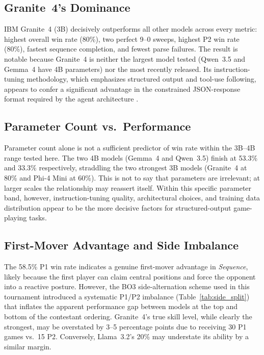 \documentclass[11pt]{article}
\begin{document}
\subsection{Granite~4's Dominance}

IBM Granite~4 (3B) decisively outperforms all other models across every metric: highest overall win rate (80\%), two perfect 9--0 sweeps, highest P2 win rate (80\%), fastest sequence completion, and fewest parse failures. The result is notable because Granite~4 is neither the largest model tested (Qwen~3.5 and Gemma~4 have 4B parameters) nor the most recently released. Its instruction-tuning methodology, which emphasizes structured output and tool-use following, appears to confer a significant advantage in the constrained JSON-response format required by the agent architecture \cite{granite4}.

\subsection{Parameter Count vs.\ Performance}

Parameter count alone is not a sufficient predictor of win rate within the 3B--4B range tested here. The two 4B models (Gemma~4 and Qwen~3.5) finish at 53.3\% and 33.3\% respectively, straddling the two strongest 3B models (Granite~4 at 80\% and Phi-4 Mini at 60\%). This is not to say that parameters are irrelevant; at larger scales the relationship may reassert itself. Within this specific parameter band, however, instruction-tuning quality, architectural choices, and training data distribution appear to be the more decisive factors for structured-output game-playing tasks.

\subsection{First-Mover Advantage and Side Imbalance}

The 58.5\% P1 win rate indicates a genuine first-mover advantage in \textit{Sequence}, likely because the first player can claim central positions and force the opponent into a reactive posture. However, the BO3 side-alternation scheme used in this tournament introduced a systematic P1/P2 imbalance (Table~\ref{tab:side_split}) that inflates the apparent performance gap between models at the top and bottom of the contestant ordering. Granite~4's true skill level, while clearly the strongest, may be overstated by 3--5 percentage points due to receiving 30 P1 games vs.\ 15 P2. Conversely, Llama~3.2's 20\% may understate its ability by a similar margin.
\end{document}
